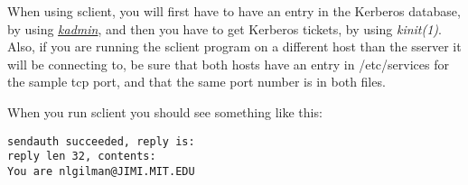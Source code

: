 \documentclass[letterpaper,10pt,english]{sphinxmanual}
\begin{document}
When using sclient, you will first have to have an entry in the
Kerberos database, by using {\hyperref[admin/admin_commands/kadmin_local:kadmin-1]{\emph{kadmin}}}, and then you have to get
Kerberos tickets, by using \emph{kinit(1)}.  Also, if you are running
the sclient program on a different host than the sserver it will be
connecting to, be sure that both hosts have an entry in /etc/services
for the sample tcp port, and that the same port number is in both
files.

When you run sclient you should see something like this:

\begin{Verbatim}[commandchars=\\\{\}]
sendauth succeeded, reply is:
reply len 32, contents:
You are nlgilman@JIMI.MIT.EDU
\end{Verbatim}
\end{document}
